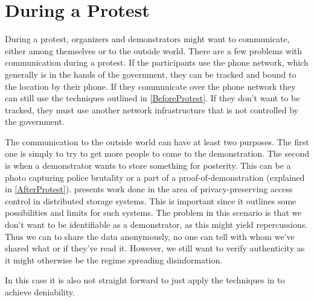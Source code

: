 \section{During a Protest}
\label{DuringProtest}

During a protest, organizers and demonstrators might want to communicate, 
either among themselves or to the outside world.
There are a few problems with communication during a protest.
If the participants use the phone network, which generally is in the hands of 
the government, they can be tracked and bound to the location by their phone.
If they communicate over the phone network they can still use the techniques 
outlined in \cref{BeforeProtest}.
If they don't want to be tracked, they must use another network infrastructure 
that is not controlled by the government.

The communication to the outside world can have at least two purposes.
The first one is simply to try to get more people to come to the demonstration.
The second is when a demonstrator wants to store something for posterity.
This can be a photo capturing police brutality or a part of 
a proof-of-demonstration (explained in \cref{AfterProtest}).
\citet{DistStorAccessControl} presents work done in the area of 
privacy-preserving access control in distributed storage systems.
This is important since it outlines some possibilities and limits for such 
systems.
The problem in this scenario is that we don't want to be identifiable as 
a demonstrator, as this might yield repercussions.
Thus we can to share the data anonymously, no one can tell with whom we've 
shared what or if they've read it.
However, we still want to verify authenticity as it might otherwise be the 
regime spreading disinformation.

In this case it is also not straight forward to just apply the techniques in 
\cite{OTPKX} to achieve deniability.

